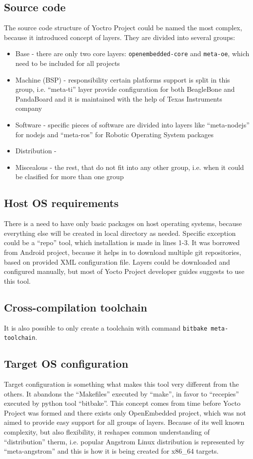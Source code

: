 \documentclass[printmode]{mgr}
\begin{document}
\subsection*{Source code}

The source code structure of Yoctro Project could be named the most complex, because it introduced concept of layers.
They are divided into several groups:
\begin{itemize}
    \item Base - there are only two core layers: \verb|openembedded-core| and \verb|meta-oe|, which need to be included for all projects
    \item Machine (BSP) - responsibility certain platforms support is split in this group, i.e. ``meta-ti'' layer provide configuration for both BeagleBone and PandaBoard and it is maintained with the help of Texas Instruments company
    \item Software - specific pieces of software are divided into layers like ``meta-nodejs'' for nodejs and ``meta-ros'' for Robotic Operating System packages
    \item Distribution - 
    \item Miscealous - the rest, that do not fit into any other group, i.e. when it could be clasified for more than one group
\end{itemize}

\subsection*{Host OS requirements}

There is a need to have only basic packages on host operating systems, because everything else will be created in local directory as needed.
Specific exception could be a ``repo'' tool, which installation is made in lines 1-3.
It was borrowed from Android project, because it helps in to download multiple git repositories, based on provided XML configuration file.
Layers could be downloaded and configured manually, but most of Yocto Project developer guides suggests to use this tool.

\subsection*{Cross-compilation toolchain}
It is also possible to only create a toolchain with command \verb|bitbake meta-toolchain|.

\subsection*{Target OS configuration}
Target configuration is something what makes this tool very different from the others.
It abandons the ``Makefiles'' executed by ``make'', in favor to ``recepies'' executed by python tool ``bitbake''.
This concept comes from time before Yocto Project was formed and there exists only OpenEmbedded project, which was not aimed to provide easy support for all groups of layers.
Because of its well known complexity, but also flexibility, it reshapes common understanding of ``distribution'' therm, i.e. popular Angstrom Linux distribution is represented by ``meta-angstrom'' and this is how it is being created for x86\_64 targets.
\end{document}
